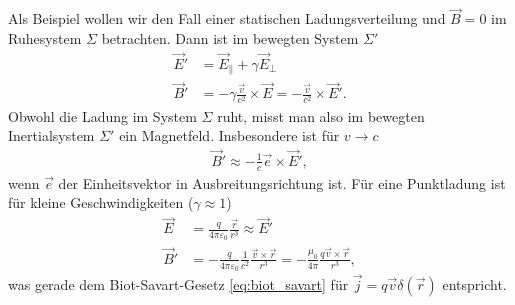 Als Beispiel wollen wir den Fall einer statischen Ladungsverteilung und $\vec B=0$ im Ruhesystem $\Sigma$ betrachten. Dann ist im bewegten System $\Sigma'$
\begin{align*}
    \vec E' & =\vec E_\parallel + \gamma \vec E_\perp                                      \\
    \vec B' & =-\gamma\frac{\vec v}{c^2}\times \vec E = -\frac{\vec v}{c^2}\times \vec E'.
\end{align*}
Obwohl die Ladung im System $\Sigma$ ruht, misst man also im bewegten Inertialsystem $\Sigma'$ ein Magnetfeld.
Insbesondere ist für $v\rightarrow c$
\begin{align*}
    \vec B'\approx -\frac{1}{c}\vec e\times\vec E',
\end{align*}
wenn $\vec e$ der Einheitsvektor in Ausbreitungsrichtung ist. Für eine Punktladung ist für kleine Geschwindigkeiten ($\gamma\approx 1$)
\begin{align*}
    \vec E  & = \frac{q}{4\pi\varepsilon_0} \frac{\vec r}{r^3} \approx \vec E'                                                                  \\
    \vec B' & = - \frac{q}{4\pi\varepsilon_0} \frac{1}{c^2}\frac{\vec v\times\vec r}{r^3}=-\frac{\mu_0}{4\pi} \frac{q\vec v\times \vec r}{r^3},
\end{align*}
was gerade dem Biot-Savart-Gesetz \eqref{eq:biot_savart} für $\vec j=q\vec v\delta(\vec r)$ entspricht.

